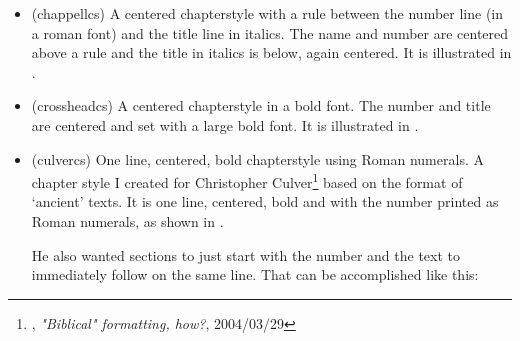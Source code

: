 \begin{itemize}
\item[\cstyle{chappell}] 
\glossary(chappellcs)%
  {}%
  { A centered chapterstyle with a rule between
   the number line (in a roman font) and the title line in italics.}
The name and number are centered above a rule and the
title in italics is below, again centered. It is illustrated in 
.


\item[\cstyle{crosshead}] 
\glossary(crossheadcs)%
  {}%
  { A centered chapterstyle in a bold font.}
The number and title are centered and set with a large bold font.
It is illustrated in 
.



\item[\cstyle{culver}] 
\glossary(culvercs)%
  {}%
  {One line, centered, bold chapterstyle using Roman numerals.}
A chapter style I created for 
  Christopher
  Culver\footnote{\ctt, \textit{"Biblical" formatting, how?}, 2004/03/29}
  based on the format of `ancient' texts.
 It is one line, centered, bold and with the number printed as Roman numerals,
as shown in .

\begin{comment}
\makechapterstyle{culver}{
  \chapterstyle{default}
  \chapterstyle{article}
  \renewcommand*{\thechapter}{\Roman{chapter}}
  \renewcommand*{\printchapternum}{%
    \centering\chapnumfont \thechapter\space\space}%
  \renewcommand*{\printchapternonum}{\centering}
  \renewcommand*{\clearforchapter}{}%
  \aliaspagestyle{chapter}{headings}%
}
\end{comment}


    He also wanted sections to just start with the number and the text to 
immediately follow on the same line. That can be accomplished like this:
\begin{lcode}
\renewcommand*{\thesection}{\arabic{section}}
\renewcommand*{\section}[1]{%
  \refstepcounter{section}%
  \par\noindent
  \textbf{\thesection.}%
  \space\nolinebreak}
\end{lcode}


\end{itemize}
